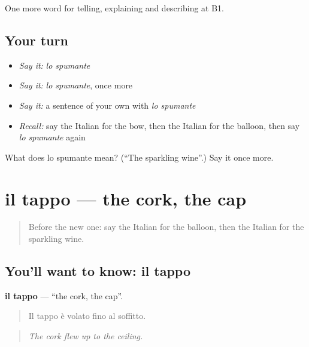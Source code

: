 \begin{grammarlens}[title={What you've built}]
One more word for telling, explaining and describing at B1.
\end{grammarlens}

\subsection*{Your turn}
\begin{itemize}
\raggedright
  \item \emph{Say it:} \emph{lo spumante}
  \item \emph{Say it:} \emph{lo spumante}, once more
  \item \emph{Say it:} a sentence of your own with \emph{lo spumante}
  \item \emph{Recall:} say the Italian for the bow, then the Italian for the balloon, then say \emph{lo spumante} again
\end{itemize}

\begin{tcolorbox}[breakable,colback=teal!4,colframe=teal!35!black,title={Before you move on}]
What does lo spumante mean? (\textquotedblleft{}The sparkling wine\textquotedblright{}.) Say it once more.
\end{tcolorbox}
\section[il tappo]{il tappo — the cork, the cap}

\label{lesson:IT-C317-tappo}



\begin{quote}
Before the new one: say the Italian for the balloon, then the Italian for the sparkling wine.
\end{quote}

\subsection*{You'll want to know: il tappo}
\textbf{il tappo} — \textquotedblleft{}the cork, the cap\textquotedblright{}.

\begin{quote}
Il tappo è volato fino al soffitto.
\end{quote}

\begin{quote}
\emph{The cork flew up to the ceiling.}
\end{quote}

